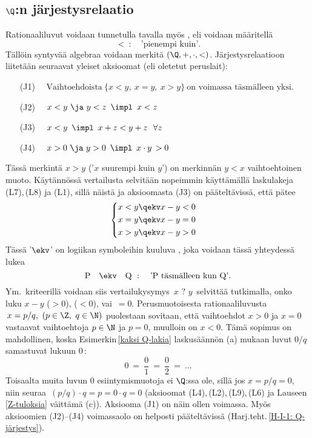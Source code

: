 \subsection{$\Q$:n järjestysrelaatio}

Rationaaliluvut voidaan tunnetulla tavalla myös , eli voidaan määritellä
\[
<\ : \quad \text{'pienempi kuin'}.
\]
Tällöin syntyvää algebraa voidaan merkitä $(\Q,+,\cdot,<)$. Järjestysrelaatioon liitetään seuraavat
yleiset aksioomat (eli oletetut peruslait):

\pagebreak

\begin{itemize}
\item[(J1)] $\quad \text{Vaihtoehdoista}\ \{x<y,\ x=y,\ x>y\}\ 
                                          \text{on voimassa täsmälleen yksi}.$
\item[(J2)] $\quad x<y\ \ja\ y<z \,\ \impl\,\ x<z$
\item[(J3)] $\quad x<y \,\ \impl\,\ x+z < y+z \ \ \forall z$
\item[(J4)] $\quad x > 0 \ \ja\ y > 0 \,\ \impl\,\ x \cdot y\, > 0$
\end{itemize}
Tässä merkintä $x>y$ ('$x$ suurempi kuin $y$') on merkinnän $y<x$ vaihtoehtoinen muoto. Käytännössä 
vertailusta selvitään nopeimmin käyttämällä laskulakeja (L7),\,(L8) ja (L1), sillä näistä ja 
aksioomasta (J3) on pääteltävissä, että pätee
\[ 
\begin{cases} \begin{aligned}
x<y &\qekv x-y < 0 \\ x=y &\qekv x-y = 0 \\ x>y &\qekv x-y > 0
\end{aligned} \end{cases}
\] 
Tässä '$\ekv$' on logiikan symboleihin kuuluva , joka voidaan tässä 
yhteydessä lukea
\[
\text{P} \quad \ekv \quad \text{Q}\ : \quad \text{'P täsmälleen kun Q'}.
\]
Ym.\ kriteerillä voidaan siis vertailukysymys $\,x$ ? $y\,$ selvittää tutkimalla, onko luku 
$x-y$ \kor{positiivinen} ($>0$), \kor{negatiivinen} ($<0$), vai $\,=0$. Perusmuotoisesta
rationaaliluvusta $\,x = p/q,\ (p\in\Z,\ q\in \N)$ puolestaan sovitaan, että vaihtoehdot
$x>0$ ja $x=0$ vastaavat vaihtoehtoja $p\in\N$ ja $p=0$, muulloin on $x<0$. Tämä sopimus on
mahdollinen, koska Esimerkin\,\ref{kaksi Q-lakia} laskusäännön (a) mukaan luvut $0/q$ samastuvat
lukuun $0$\,:
\[
0\ =\ \dfrac{0}{1}\ =\ \dfrac{0}{2}\ =\ \ldots
\]
Toisaalta muita luvun $0$ esiintymismuotoja ei $\Q$:ssa ole, sillä jos $x=p/q=0$, niin seuraa
$\,(p/q) \cdot q = p = 0 \cdot q = 0$ (aksioomat (L4),\,(L2),\,(L9),\,(L6) ja Lauseen \ref{Z-tuloksia}
väittämä (c)). Aksiooma (J1) on näin ollen voimassa. Myös aksioomien (J2)--(J4) voimassaolo on
helposti pääteltävissä (Harj.teht.\,\ref{H-I-1: Q-järjestys}).

